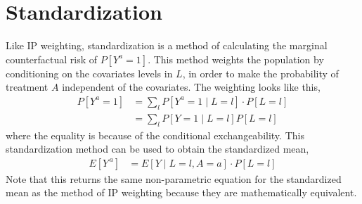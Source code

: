 \section{Standardization} \label{Standardization} 
Like IP weighting, standardization is a method of calculating the marginal counterfactual risk of $P[Y^a = 1]$.  This method weights the population by  conditioning on the covariates levels in $L$, in order to make the probability of treatment $A$ independent of the covariates.  The weighting looks like this, 
\begin{align} 
P[Y^a = 1] &= \sum_l P[Y^a = 1 \mid L=l] \cdot P[L = l] \\ 
&= \sum_l P[Y = 1 \mid L=l] P[L = l]  
\end{align} 
where the equality is because of the conditional exchangeability.  This standardization method can be used to obtain the standardized mean, 
\begin{align} 
E[Y^{\,a}] &= E[Y \mid L = l, A =a ] \cdot P[L=l] 
\end{align} 
Note that this returns the same non-parametric equation for the standardized mean as the method of IP weighting because they are mathematically equivalent.  

